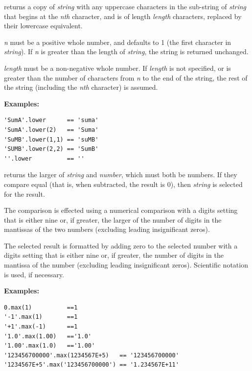 \begin{description}
returns a copy of \emph{string} with any uppercase characters in
the sub-string of \emph{string} that begins at the \emph{n}\emph{th}
character, and is of length \emph{length} characters, replaced by
their lowercase equivalent.
 
\emph{n} must be a positive whole number, and defaults to 1 (the
first character in \emph{string}).  If \emph{n} is greater than
the length of \emph{string}, the string is returned unchanged.
 
\emph{length} must be a non-negative whole number.
If \emph{length} is not specified, or is greater than the number of
characters from \emph{n} to the end of the string, the rest of the
string (including the \emph{n}\emph{th} character) is assumed.
 
\textbf{Examples:}
\begin{lstlisting}
'SumA'.lower      == 'suma'
'SumA'.lower(2)   == 'Suma'
'SuMB'.lower(1,1) == 'suMB'
'SUMB'.lower(2,2) == 'SumB'
''.lower          == ''
\end{lstlisting}

\item[max(number)]\label{refmax}

returns the larger of \emph{string} and \emph{number}, which
must both be numbers.  If they compare equal (that is, when subtracted,
the result is 0), then \emph{string} is selected for the result.
 
The comparison is effected using a numerical comparison with a digits
setting that is either nine or, if greater, the larger of the number of
digits in the mantissas of the two numbers (excluding leading
insignificant zeros).
 
The selected result is formatted by adding zero to the selected number
with a digits setting that is either nine or, if greater, the number of
digits in the mantissa of the number (excluding leading insignificant
zeros).
Scientific notation is used, if necessary.
 
\textbf{Examples:}
\begin{lstlisting}
0.max(1)          ==1
'-1'.max(1)       ==1
'+1'.max(-1)      ==1
'1.0'.max(1.00)   =='1.0'
'1.00'.max(1.0)   =='1.00'
'123456700000'.max(1234567E+5)   == '123456700000'
'1234567E+5'.max('123456700000') == '1.234567E+11'
\end{lstlisting}

\item[min(number)]\label{refmin}


\end{description}
